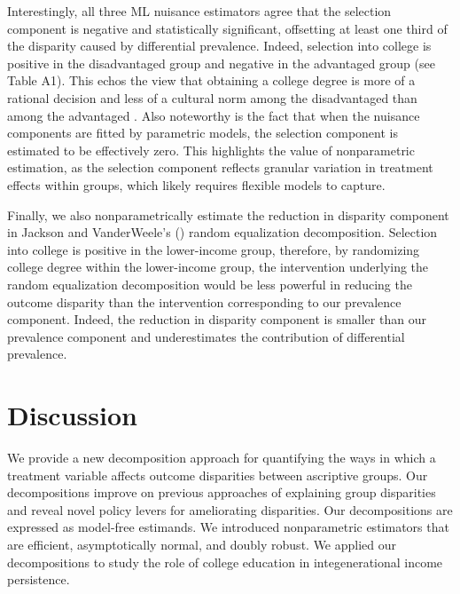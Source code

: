 \documentclass[12pt,a4paper]{article}
\begin{document}
Interestingly, all three ML nuisance estimators agree that the selection component is negative and statistically significant, offsetting at least one third of the disparity caused by differential prevalence. Indeed, selection into college is positive in the disadvantaged group and negative in the advantaged group (see Table A1). This echos the view that obtaining a college degree is more of a rational decision and less of a cultural norm among the disadvantaged than among the advantaged \citep{mare_social_1980, hout_social_2012}. Also noteworthy is the fact that when the nuisance components are fitted by parametric models, the selection component is estimated to be effectively zero. This highlights the value of nonparametric estimation, as the selection component reflects granular variation in treatment effects within groups, which likely requires flexible models to capture.

Finally, we also nonparametrically estimate the reduction in disparity component in Jackson and VanderWeele's (\citeyear{jackson_decomposition_2018}) random equalization decomposition. Selection into college is positive in the lower-income group, therefore, by randomizing college degree within the lower-income group, the intervention underlying the random equalization decomposition would be less powerful in reducing the outcome disparity than the intervention corresponding to our prevalence component. Indeed, the reduction in disparity component is smaller than our prevalence component and underestimates the contribution of differential prevalence. 

\section{Discussion}
We provide a new decomposition approach for quantifying the  ways in which a treatment variable affects outcome disparities between ascriptive groups. Our decompositions improve on previous approaches of explaining group disparities and reveal novel policy levers for ameliorating disparities. Our decompositions are expressed as model-free estimands. We introduced nonparametric estimators that are efficient, asymptotically normal, and doubly robust. We applied our decompositions to study the role of college education in integenerational income persistence. 
\end{document}
